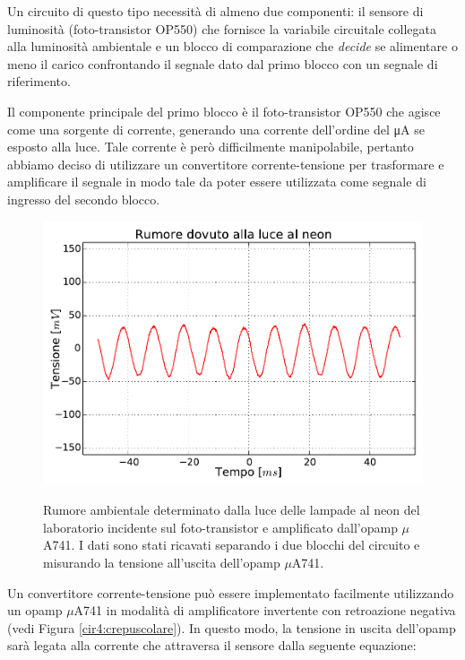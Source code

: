 Un circuito di questo tipo necessità di almeno due componenti: il sensore di luminosità (foto-transistor OP550) che fornisce la variabile circuitale collegata alla luminosità ambientale e un blocco di comparazione che \textit{decide} se alimentare o meno il carico confrontando il segnale dato dal primo blocco con un segnale di riferimento.

Il componente principale del primo blocco è il foto-transistor OP550 che agisce come una sorgente di corrente, generando una corrente dell'ordine del \si{\uA} se esposto alla luce.
Tale corrente è però difficilmente manipolabile, pertanto abbiamo deciso di utilizzare un convertitore corrente-tensione per trasformare e amplificare il segnale in modo tale da poter essere utilizzata come segnale di ingresso del secondo blocco.

\begin{figure}[ht]
 \centering
   {\includegraphics[width=14.5cm]{../E04/latex/neon.pdf}}
 \caption{Rumore ambientale determinato dalla luce delle lampade al neon del laboratorio incidente sul foto-transistor e amplificato dall'opamp $\mu$A741. I dati sono stati ricavati separando i due blocchi del circuito e misurando la tensione all'uscita dell'opamp $\mu$A741.}
 \label{gr4:neon}
\end{figure}

Un convertitore corrente-tensione può essere implementato facilmente utilizzando un opamp $\mu$A741 in modalità di amplificatore invertente con retroazione negativa (vedi Figura \ref{cir4:crepuscolare}).
In questo modo, la tensione in uscita dell'opamp sarà legata alla corrente che attraversa il sensore dalla seguente equazione:

